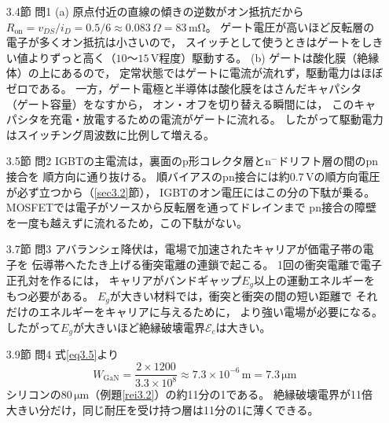 \answer
\begin{enumerate}

\item[3.4節 問1]
(a) 原点付近の直線の傾きの逆数がオン抵抗だから
$R_{\mathrm{on}} = v_{DS}/i_D = 0.5/6 \approx 0.083\,\Omega = 83\,\mathrm{m\Omega}$。
ゲート電圧が高いほど反転層の電子が多くオン抵抗は小さいので，
スイッチとして使うときはゲートをしきい値よりずっと高く（$10$〜$15$\,V程度）駆動する。
(b) ゲートは酸化膜（絶縁体）の上にあるので，
定常状態ではゲートに電流が流れず，駆動電力はほぼゼロである。
一方，ゲート電極と半導体は酸化膜をはさんだキャパシタ（ゲート容量）をなすから，
オン・オフを切り替える瞬間には，
このキャパシタを充電・放電するための電流がゲートに流れる。
したがって駆動電力はスイッチング周波数に比例して増える。

\item[3.5節 問2]
IGBTの主電流は，裏面のp形コレクタ層とn$^-$ドリフト層の間のpn接合を
順方向に通り抜ける。
順バイアスのpn接合には約$0.7$\,Vの順方向電圧が必ず立つから（\ref{sec3.2}節），
IGBTのオン電圧にはこの分の下駄が乗る。
MOSFETでは電子がソースから反転層を通ってドレインまで
pn接合の障壁を一度も越えずに流れるため，この下駄がない。

\item[3.7節 問3]
アバランシェ降伏は，電場で加速されたキャリアが価電子帯の電子を
伝導帯へたたき上げる衝突電離の連鎖で起こる。
1回の衝突電離で電子正孔対を作るには，
キャリアがバンドギャップ$E_g$以上の運動エネルギーをもつ必要がある。
$E_g$が大きい材料では，衝突と衝突の間の短い距離で
それだけのエネルギーをキャリアに与えるために，
より強い電場が必要になる。
したがって$E_g$が大きいほど絶縁破壊電界$\mathcal{E}_c$は大きい。

\item[3.9節 問4]
式\ref{eq3.5}より
\begin{equation*}
W_{\mathrm{GaN}} = \frac{2\times1200}{3.3\times10^8}
\approx 7.3\times10^{-6}\,\mathrm{m} = 7.3\,\mathrm{\mu m}
\end{equation*}
シリコンの$80\,\mathrm{\mu m}$（例題\ref{rei3.2}）の約11分の1である。
絶縁破壊電界が11倍大きい分だけ，同じ耐圧を受け持つ層は11分の1に薄くできる。

\end{enumerate}
